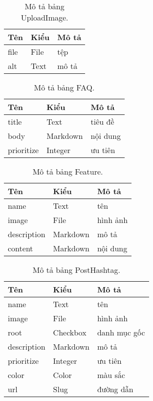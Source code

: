 \begin{table}[h!]
\begin{center}
	\caption{Mô tả bảng UploadImage.}
	\begin{tabular}{ |l|l|l| } 
	\hline
	Tên & Kiểu & Mô tả \\
	\hline
	file & File & tệp \\
alt & Text & mô tả \\ 
	\hline
\end{tabular}
	\label{table:UploadImage}
\end{center}
\end{table}


\begin{table}[h!]
\begin{center}
	\caption{Mô tả bảng FAQ.}
	\begin{tabular}{ |l|l|l| } 
	\hline
	Tên & Kiểu & Mô tả \\
	\hline
	title & Text & tiêu đề \\
body & Markdown & nội dung \\
prioritize & Integer & ưu tiên \\ 
	\hline
\end{tabular}
	\label{table:FAQ}
\end{center}
\end{table}


\begin{table}[h!]
\begin{center}
	\caption{Mô tả bảng Feature.}
	\begin{tabular}{ |l|l|l| } 
	\hline
	Tên & Kiểu & Mô tả \\
	\hline
	name & Text & tên \\
image & File & hình ảnh \\
description & Markdown & mô tả \\
content & Markdown & nội dung \\ 
	\hline
\end{tabular}
	\label{table:Feature}
\end{center}
\end{table}


\begin{table}[h!]
\begin{center}
	\caption{Mô tả bảng PostHashtag.}
	\begin{tabular}{ |l|l|l| } 
	\hline
	Tên & Kiểu & Mô tả \\
	\hline
	name & Text & tên \\
image & File & hình ảnh \\
root & Checkbox & danh mục gốc \\
description & Markdown & mô tả \\
prioritize & Integer & ưu tiên \\
color & Color & màu sắc \\
url & Slug & đường dẫn \\ 
	\hline
\end{tabular}
	\label{table:PostHashtag}
\end{center}
\end{table}


